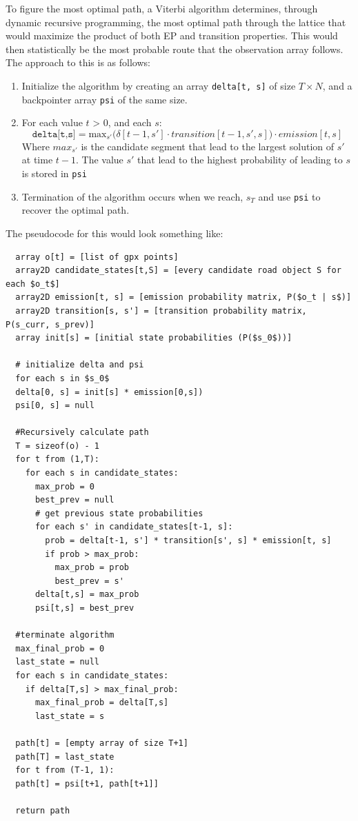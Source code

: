 \documentclass[12pt,a4paper]{report}
\begin{document}
To figure the most optimal path, a Viterbi algorithm determines, through dynamic recursive programming, the most optimal path through the lattice that would
maximize the product of both EP and transition properties. This would then statistically be the most probable route that the observation array follows.
The approach to this is as follows:
\begin{enumerate}
	\item Initialize the algorithm by creating an array \texttt{delta[t, s]} of size $T \times N$, and a backpointer array \texttt{psi} of the same size.
	\item For each value $t$ > 0, and each $s$:
	      \[
		      \texttt{delta[t,s]} = \text{max}_{s'} \bigg(\delta[t-1, s'] \cdot transition[t-1, s', s]\bigg) \cdot emission[t,s]
	      \]
	      Where $max_{s'}$ is the candidate segment that lead to the largest solution of $s'$ at time $t-1$.
	      The value $s'$ that lead to the highest probability of leading to $s$ is stored in \texttt{psi}
	\item Termination of the algorithm occurs when we reach, $s_T$ and use \texttt{psi} to recover the optimal path.
\end{enumerate}

\newpage
The pseudocode for this would look something like:
\begin{lstlisting}
  array o[t] = [list of gpx points]
  array2D candidate_states[t,S] = [every candidate road object S for each $o_t$]
  array2D emission[t, s] = [emission probability matrix, P($o_t | s$)]
  array2D transition[s, s'] = [transition probability matrix, P(s_curr, s_prev)]
  array init[s] = [initial state probabilities (P($s_0$))]
  
  # initialize delta and psi
  for each s in $s_0$
  delta[0, s] = init[s] * emission[0,s])
  psi[0, s] = null

  #Recursively calculate path
  T = sizeof(o) - 1
  for t from (1,T):
    for each s in candidate_states:
      max_prob = 0
      best_prev = null
      # get previous state probabilities
      for each s' in candidate_states[t-1, s]:
        prob = delta[t-1, s'] * transition[s', s] * emission[t, s]
        if prob > max_prob:
          max_prob = prob
          best_prev = s'
      delta[t,s] = max_prob
      psi[t,s] = best_prev

  #terminate algorithm
  max_final_prob = 0
  last_state = null
  for each s in candidate_states:
    if delta[T,s] > max_final_prob:
      max_final_prob = delta[T,s]
      last_state = s
    
  path[t] = [empty array of size T+1]
  path[T] = last_state
  for t from (T-1, 1):
  path[t] = psi[t+1, path[t+1]]

  return path

\end{lstlisting}
\end{document}
